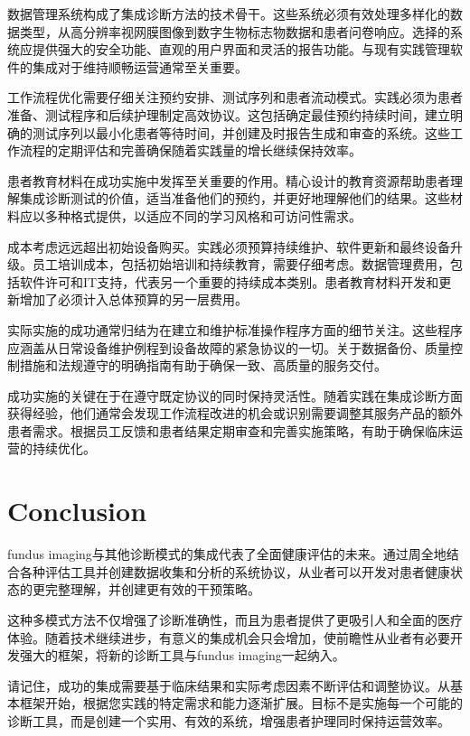 \documentclass[
  Letterpaper,
]{scrbook}
\begin{document}
数据管理系统构成了集成诊断方法的技术骨干。这些系统必须有效处理多样化的数据类型，从高分辨率视网膜图像到数字生物标志物数据和患者问卷响应。选择的系统应提供强大的安全功能、直观的用户界面和灵活的报告功能。与现有实践管理软件的集成对于维持顺畅运营通常至关重要。

工作流程优化需要仔细关注预约安排、测试序列和患者流动模式。实践必须为患者准备、测试程序和后续护理制定高效协议。这包括确定最佳预约持续时间，建立明确的测试序列以最小化患者等待时间，并创建及时报告生成和审查的系统。这些工作流程的定期评估和完善确保随着实践量的增长继续保持效率。

患者教育材料在成功实施中发挥至关重要的作用。精心设计的教育资源帮助患者理解集成诊断测试的价值，适当准备他们的预约，并更好地理解他们的结果。这些材料应以多种格式提供，以适应不同的学习风格和可访问性需求。

成本考虑远远超出初始设备购买。实践必须预算持续维护、软件更新和最终设备升级。员工培训成本，包括初始培训和持续教育，需要仔细考虑。数据管理费用，包括软件许可和IT支持，代表另一个重要的持续成本类别。患者教育材料开发和更新增加了必须计入总体预算的另一层费用。

实际实施的成功通常归结为在建立和维护标准操作程序方面的细节关注。这些程序应涵盖从日常设备维护例程到设备故障的紧急协议的一切。关于数据备份、质量控制措施和法规遵守的明确指南有助于确保一致、高质量的服务交付。

成功实施的关键在于在遵守既定协议的同时保持灵活性。随着实践在集成诊断方面获得经验，他们通常会发现工作流程改进的机会或识别需要调整其服务产品的额外患者需求。根据员工反馈和患者结果定期审查和完善实施策略，有助于确保临床运营的持续优化。

\section{Conclusion}\label{conclusion}

fundus
imaging与其他诊断模式的集成代表了全面健康评估的未来。通过周全地结合各种评估工具并创建数据收集和分析的系统协议，从业者可以开发对患者健康状态的更完整理解，并创建更有效的干预策略。

这种多模式方法不仅增强了诊断准确性，而且为患者提供了更吸引人和全面的医疗体验。随着技术继续进步，有意义的集成机会只会增加，使前瞻性从业者有必要开发强大的框架，将新的诊断工具与fundus
imaging一起纳入。

请记住，成功的集成需要基于临床结果和实际考虑因素不断评估和调整协议。从基本框架开始，根据您实践的特定需求和能力逐渐扩展。目标不是实施每一个可能的诊断工具，而是创建一个实用、有效的系统，增强患者护理同时保持运营效率。
\end{document}
